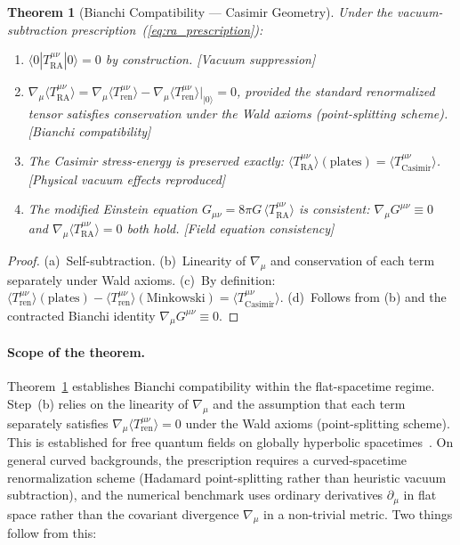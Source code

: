 \documentclass[11pt,a4paper]{article}
\theoremstyle{plain}
\newtheorem{theorem}{Theorem}[section]
\theoremstyle{definition}
\theoremstyle{remark}
\newcommand{\Tact}{T^{\mu\nu}_{\mathrm{RA}}}
\newcommand{\ket}[1]{|#1\rangle}
\begin{document}
\begin{enumerate}[label=(\roman*)]
  \begin{theorem}[Bianchi Compatibility --- Casimir Geometry]
  \label{thm:bianchi}
  Under the vacuum-subtraction prescription~(\ref{eq:ra_prescription}):
  \begin{enumerate}[label=\emph{(\alph*)}]
    \item $\langle 0|\Tact|0\rangle = 0$ by construction.
    \textup{[Vacuum suppression]}
    \item $\nabla_{\mu}\langle\Tact\rangle = \nabla_{\mu}\langle
    T^{\mu\nu}_{\mathrm{ren}}\rangle - \nabla_{\mu}\langle
    T^{\mu\nu}_{\mathrm{ren}}\rangle\big|_{\ket{0}} = 0$, provided the
    standard renormalized tensor satisfies conservation under the Wald
    axioms (point-splitting scheme). \textup{[Bianchi compatibility]}
    \item The Casimir stress-energy is preserved exactly:
    $\langle\Tact\rangle(\text{plates}) = \langle
    T^{\mu\nu}_{\mathrm{Casimir}}\rangle$. \textup{[Physical vacuum
    effects reproduced]}
    \item The modified Einstein equation $G_{\mu\nu} = 8\pi G\,\langle
    \Tact\rangle$ is consistent: $\nabla_{\mu}G^{\mu\nu} \equiv 0$ and
    $\nabla_{\mu}\langle\Tact\rangle = 0$ both hold.
    \textup{[Field equation consistency]}
  \end{enumerate}
  \end{theorem}
  \begin{proof}
  (a)~Self-subtraction. (b)~Linearity of $\nabla_\mu$ and conservation
  of each term separately under Wald axioms. (c)~By definition:
  $\langle T^{\mu\nu}_{\mathrm{ren}}\rangle(\text{plates}) -
  \langle T^{\mu\nu}_{\mathrm{ren}}\rangle(\text{Minkowski}) =
  \langle T^{\mu\nu}_{\mathrm{Casimir}}\rangle$. (d)~Follows from
  (b) and the contracted Bianchi identity $\nabla_\mu G^{\mu\nu}
  \equiv 0$.
  \end{proof}

  \paragraph{Scope of the theorem.}
  Theorem~\ref{thm:bianchi} establishes Bianchi compatibility within the
  flat-spacetime regime. Step~(b) relies on the linearity of $\nabla_\mu$ and the
  assumption that each term separately satisfies $\nabla_\mu \langle
  T^{\mu\nu}_{\mathrm{ren}}\rangle = 0$ under the Wald axioms (point-splitting
  scheme). This is established for free quantum fields on globally hyperbolic
  spacetimes~\citep{Wald1994}. On general curved backgrounds, the prescription
  requires a curved-spacetime renormalization scheme (Hadamard point-splitting
  rather than heuristic vacuum subtraction), and the numerical benchmark uses
  ordinary derivatives $\partial_\mu$ in flat space rather than the covariant
  divergence $\nabla_\mu$ in a non-trivial metric. Two things follow from this:


\end{enumerate}
\end{document}
